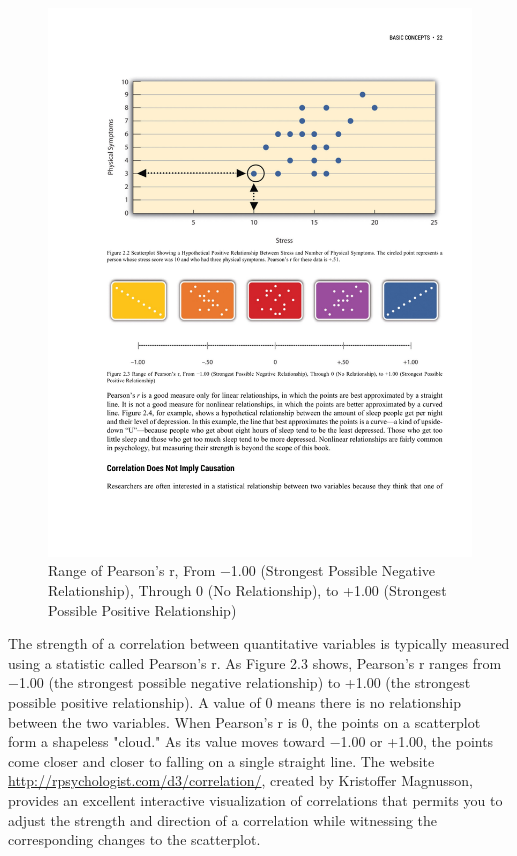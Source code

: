  \begin{figure}
       \includegraphics[width=\linewidth]{figures/C2F4Correlation2.pdf}
       \caption{Range of Pearson’s r, From −1.00 (Strongest Possible Negative Relationship), Through 0 (No Relationship), to +1.00 (Strongest Possible Positive Relationship)}
       \label{fig:Correlation2}
 \end{figure}

The strength of a correlation between quantitative variables is typically measured using a statistic called Pearson's r. As Figure 2.3 shows, Pearson's r ranges from −1.00 (the strongest possible negative relationship) to +1.00 (the strongest possible positive relationship). A value of 0 means there is no relationship between the two variables. When Pearson's r is 0, the points on a scatterplot form a shapeless "cloud." As its value moves toward −1.00 or +1.00, the points come closer and closer to falling on a single straight line. The website \url{http://rpsychologist.com/d3/correlation/}, created by Kristoffer Magnusson, provides an excellent interactive visualization of correlations that permits you to adjust the strength and direction of a correlation while witnessing the corresponding changes to the scatterplot.


